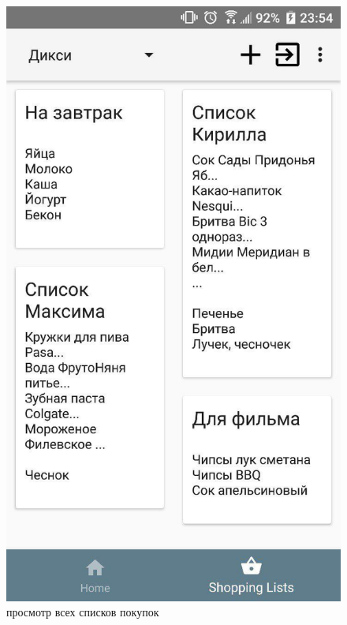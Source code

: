 \begin{figure}[h!]
    \centering
    \includegraphics[height=0.38\textheight]{./screenshots/3/all_shoplists.jpg}
    \caption{\small{просмотр всех списков покупок}}
    \endminipage\hfill

\end{figure}

